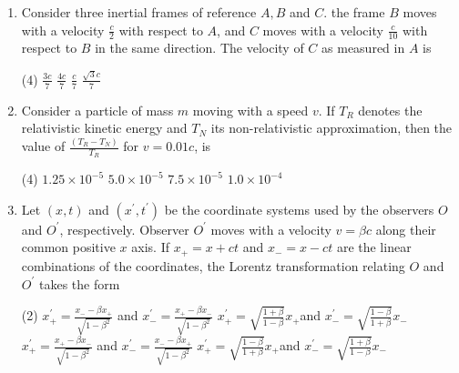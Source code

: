 \begin{enumerate}
\begin{tasks}(4)
	\task[\textbf{A.}] $35 \sqrt{3} \mathrm{GeV}$
	\task[\textbf{B.}]$35 \mathrm{GeV}$
	\task[\textbf{C.}]$30 \mathrm{GeV}$
	\task[\textbf{D.}]$15 \mathrm{GeV}$
\end{tasks}
	\item Consider three inertial frames of reference $A, B$ and $C$. the frame $B$ moves with a velocity $\frac{c}{2}$ with respect to $A$, and $C$ moves with a velocity $\frac{c}{10}$ with respect to $B$ in the same direction. The velocity of $C$ as measured in $A$ is
	{}

\begin{tasks}(4)
	\task[\textbf{A.}] $\frac{3 c}{7}$
	\task[\textbf{B.}]$\frac{4 c}{7}$
	\task[\textbf{C.}]$\frac{c}{7}$
	\task[\textbf{D.}] $\frac{\sqrt{3} c}{7}$
\end{tasks}
	\item Consider a particle of mass $m$ moving with a speed $v$. If $T_{R}$ denotes the relativistic kinetic energy and $T_{N}$ its non-relativistic approximation, then the value of $\frac{\left(T_{R}-T_{N}\right)}{T_{R}}$ for $v=0.01 c$, is
	{}
\begin{tasks}(4)
	\task[\textbf{A.}] $1.25 \times 10^{-5}$
	\task[\textbf{B.}]$5.0 \times 10^{-5}$
	\task[\textbf{C.}]$7.5 \times 10^{-5}$
	\task[\textbf{D.}]$1.0 \times 10^{-4}$
\end{tasks}
	\item Let $(x, t)$ and $\left(x^{\prime}, t^{\prime}\right)$ be the coordinate systems used by the observers $O$ and $O^{\prime}$, respectively. Observer $O^{\prime}$ moves with a velocity $v=\beta c$ along their common positive $x$ axis. If $x_{+}=x+c t$ and $x_{-}=x-c t$ are the linear combinations of the coordinates, the Lorentz transformation relating $O$ and $O^{\prime}$ takes the form
	{}
\begin{tasks}(2)
	\task[\textbf{A.}] $x_{+}^{\prime}=\frac{x_{-}-\beta x_{+}}{\sqrt{1-\beta^{2}}}$ and $x_{-}^{\prime}=\frac{x_{+}-\beta x_{-}}{\sqrt{1-\beta^{2}}}$
	\task[\textbf{B.}]$x_{+}^{\prime}=\sqrt{\frac{1+\beta}{1-\beta}} x_{+}$and $x_{-}^{\prime}=\sqrt{\frac{1-\beta}{1+\beta}} x_{-}$
	\task[\textbf{C.}]$x_{+}^{\prime}=\frac{x_{+}-\beta x_{-}}{\sqrt{1-\beta^{2}}}$ and $x_{-}^{\prime}=\frac{x_{-}-\beta x_{+}}{\sqrt{1-\beta^{2}}}$
	\task[\textbf{D.}]$x_{+}^{\prime}=\sqrt{\frac{1-\beta}{1+\beta}} x_{+}$and $x_{-}^{\prime}=\sqrt{\frac{1+\beta}{1-\beta}} x_{-}$
\end{tasks}

\end{enumerate}
